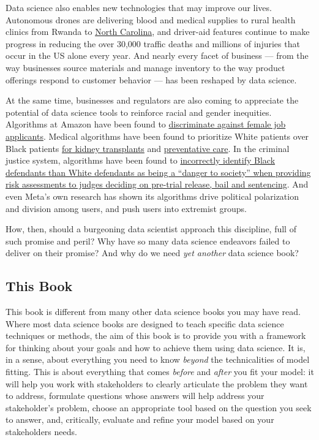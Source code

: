 \documentclass[12pt]{article}
\begin{document}
Data science also enables new technologies that may improve our lives.
Autonomous drones are delivering blood and medical supplies to rural
health clinics from Rwanda to
\href{https://www.theverge.com/2020/5/27/21270351/zipline-drones-novant-health-medical-center-hospital-supplies-ppe/}{North
Carolina}, and driver-aid features continue to make progress in reducing
the over 30,000 traffic deaths and millions of injuries that occur in
the US alone every year. And nearly every facet of business --- from the
way businesses source materials and manage inventory to the way product
offerings respond to customer behavior --- has been reshaped by data
science.

At the same time, businesses and regulators are also coming to
appreciate the potential of data science tools to reinforce racial and
gender inequities. Algorithms at Amazon have been found to
\href{https://www.reuters.com/article/us-amazon-com-jobs-automation-insight/amazon-scraps-secret-ai-recruiting-tool-that-showed-bias-against-women-idUSKCN1MK08G}{discriminate
against female job applicants}. Medical algorithms have been found to
prioritize White patients over Black patients
\href{https://www.wired.com/story/how-algorithm-blocked-kidney-transplants-black-patients/}{for
kidney transplants} and
\href{https://www.washingtonpost.com/health/2019/10/24/racial-bias-medical-algorithm-favors-white-patients-over-sicker-black-patients/}{preventative
care}. In the criminal justice system, algorithms have been found to
\href{https://www.propublica.org/article/machine-bias-risk-assessments-in-criminal-sentencing}{incorrectly
identify Black defendants than White defendants as being a ``danger to
society'' when providing risk assessments to judges deciding on
pre-trial release, bail and sentencing}. And even Meta's own research
has shown its algorithms drive political polarization and division among
users, and push users into extremist groups.

How, then, should a burgeoning data scientist approach this discipline,
full of such promise and peril? Why have so many data science endeavors
failed to deliver on their promise? And why do we need \emph{yet
another} data science book?

\subsection*{This Book}\label{this-book}

This book is different from many other data science books you may have
read. Where most data science books are designed to teach specific data
science techniques or methods, the aim of this book is to provide you
with a framework for thinking about your goals and how to achieve them
using data science. It is, in a sense, about everything you need to know
\emph{beyond} the technicalities of model fitting. This is about
everything that comes \emph{before} and \emph{after} you fit your model:
it will help you work with stakeholders to clearly articulate the
problem they want to address, formulate questions whose answers will
help address your stakeholder's problem, choose an appropriate tool
based on the question you seek to answer, and, critically, evaluate and
refine your model based on your stakeholders needs.
\end{document}
